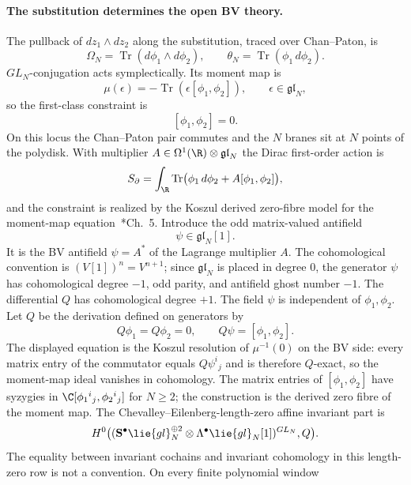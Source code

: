 \documentclass[11pt]{memoir}
\begin{document}
\paragraph{The substitution determines the open BV theory.}
The pullback of \(dz_1\wedge dz_2\) along the substitution, traced over
Chan--Paton, is
\[
  \Omega_N=\operatorname{Tr}(d\phi_1\wedge d\phi_2),\qquad
  \theta_N=\operatorname{Tr}(\phi_1\,d\phi_2).
\]
\(GL_N\)-conjugation acts symplectically.  Its moment map is
\[
  \mu(\epsilon)=-\operatorname{Tr}(\epsilon[\phi_1,\phi_2]),\qquad
  \epsilon\in\mathfrak{gl}_N,
\]
so the first-class constraint is
\[
  [\phi_1,\phi_2]=0.
\]
On this locus the Chan--Paton pair commutes and the \(N\) branes sit at
\(N\) points of the polydisk.  With multiplier
\(A\in\Omega^1(\R)\otimes\mathfrak{gl}_N\) the Dirac first-order action is
\begin{equation}\label{eq:open-action-derived}
S_\partial
  =\int_\R\operatorname{Tr}\bigl(\phi_1\,d\phi_2+A[\phi_1,\phi_2]\bigr),
\end{equation}
and the constraint is realized by the Koszul derived zero-fibre model
for the moment-map equation~\cite{costello-renormalization}*{Ch.~5}.
Introduce the odd matrix-valued antifield
\[
  \psi\in\mathfrak{gl}_N[1].
\]
It is the BV antifield \(\psi=A^*\) of the Lagrange multiplier \(A\).
The cohomological convention is \((V[1])^n=V^{n+1}\); since
\(\mathfrak{gl}_N\) is placed in degree \(0\), the generator
\(\psi\) has cohomological degree \(-1\), odd parity, and
antifield ghost number \(-1\).  The differential \(Q\) has cohomological degree
\(+1\).  The field \(\psi\) is independent of \(\phi_1,\phi_2\).  Let
\(Q\) be the derivation defined on generators by
\begin{equation}\label{eq:open-Q}
Q\phi_1=Q\phi_2=0,\qquad Q\psi=[\phi_1,\phi_2].
\end{equation}
The displayed equation is the Koszul resolution of \(\mu^{-1}(0)\) on
the BV side: every matrix entry of the commutator equals
\(Q\psi^i{}_j\) and is therefore \(Q\)-exact, so the moment-map ideal
vanishes in cohomology.  The
matrix entries of \([\phi_1,\phi_2]\) have syzygies in
\(\C[\phi_1{}^i{}_j,\phi_2{}^i{}_j]\) for \(N\geq2\); the construction
is the derived zero fibre of the moment map.  The
Chevalley--Eilenberg-length-zero affine invariant part is
\[
  H^0\bigl((\mathbf S^\bullet\lie{gl}_N^{\oplus2}
       \otimes\Lambda^\bullet\lie{gl}_N[1])^{GL_N},Q\bigr).
\]
The equality between invariant cochains and invariant cohomology in this
length-zero row is not a convention.  On every finite polynomial window
\end{document}
